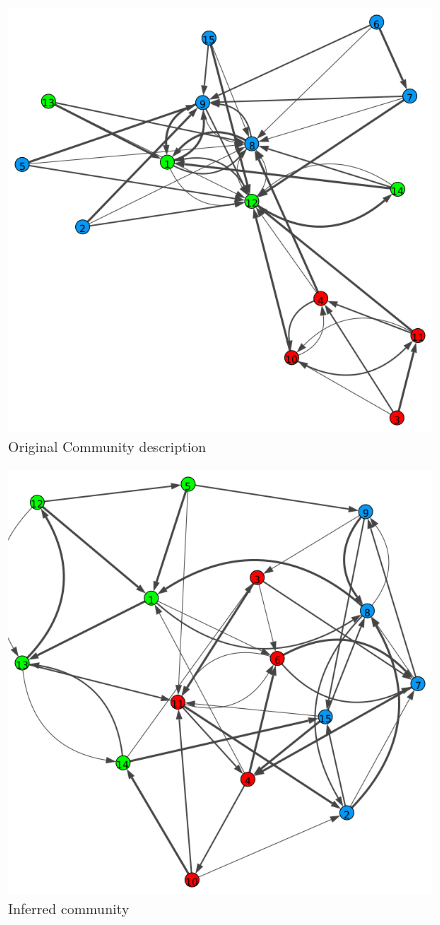 \documentclass[12pt]{ociamthesis}  %
\begin{document}
	\begin{figure}
		\centering
		\includegraphics[width=\textwidth,height=\textheight,keepaspectratio,scale=0.5]{OriginalPlot}
		\caption{Original Community description}
		\label{label-image2}
	\end{figure}

	\begin{figure}
		\centering
		\includegraphics[width=\textwidth,height=\textheight,keepaspectratio]{OptimizationPlot}
		\caption{Inferred community}
		\label{label-image3}
	\end{figure}
	
\end{document}
